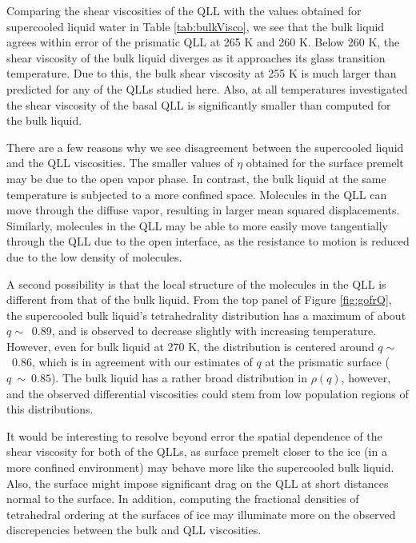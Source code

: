 Comparing the shear viscosities of the QLL with the values obtained
for supercooled liquid water in Table \ref{tab:bulkVisco}, we see that
the bulk liquid agrees within error of the prismatic QLL at 265 K and
260 K. Below 260 K, the shear viscosity of the bulk liquid diverges as
it approaches its glass transition temperature. Due to this, the bulk
shear viscosity at 255 K is much larger than predicted for any of the
QLLs studied here. Also, at all temperatures investigated the shear
viscosity of the basal QLL is significantly smaller than computed for
the bulk liquid. 

There are a few reasons why we see disagreement between the
supercooled liquid and the QLL viscosities. The smaller values of
$\eta$ obtained for the surface premelt may be due to the open vapor
phase. In contrast, the bulk liquid at the same temperature is
subjected to a more confined space. Molecules in the QLL can move
through the diffuse vapor, resulting in larger mean squared
displacements. Similarly, molecules in the QLL may be able to more
easily move tangentially through the QLL due to the open interface, as
the resistance to motion is reduced due to the low density of
molecules.

A second possibility is that the local structure of the molecules
in the QLL is different from that of the bulk liquid. From the top
panel of Figure \ref{fig:gofrQ}, the supercooled bulk liquid's
tetrahedrality distribution has a maximum of about $q \sim$~0.89, and
is observed to decrease slightly with increasing temperature. However,
even for bulk liquid at 270 K, the distribution is centered around
$q \sim$~0.86, which is in agreement with our estimates of $q$ at the
prismatic surface ($q~\sim~0.85$). The bulk liquid has a rather broad
distribution in $\rho (q)$, however, and the observed differential
viscosities could stem from low population regions of this
distributions. 

It would be interesting to resolve beyond error the spatial dependence
of the shear viscosity for both of the QLLs, as surface premelt closer
to the ice (in a more confined environment) may behave more like
the supercooled bulk liquid. Also, the surface might impose significant
drag on the QLL at short distances normal to the surface. In addition,
computing the fractional densities of tetrahedral ordering at the
surfaces of ice may illuminate more on the observed discrepencies
between the bulk and QLL viscosities. 






